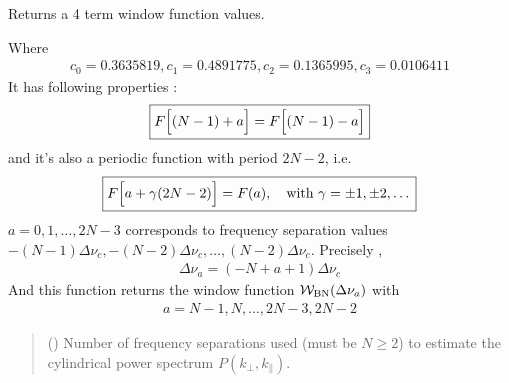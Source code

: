 \documentclass[a4paper,11pt,oneside,english,openany]{sphinxmanual}
\begin{document}
\begin{fulllineitems}
\label{\detokenize{psestimation:psestimation.window}}
\pysigstartsignatures
{}
\pysigstopsignatures
\sphinxAtStartPar
Returns a 4 term  window function values.

\begin{center}
 \end{center}

\sphinxAtStartPar
Where
\begin{equation*}
\begin{split}c_0 = 0.3635819,c_1 = 0.4891775,c_2 = 0.1365995,c_3 = 0.0106411\end{split}
\end{equation*}
\sphinxAtStartPar
It has following properties :
\begin{equation*}
\begin{split}\boxed{F\Bigl[(N-1)+a\Bigr]=F\Bigl[(N-1)-a\Bigr]}\end{split}
\end{equation*}
\sphinxAtStartPar
and it’s also a periodic function with period \(2N-2\), i.e.
\begin{equation*}
\begin{split}\boxed{F\Bigl[a+\gamma(2N-2)\Bigr] = F(a),\quad \text{\rm with } \gamma = \pm1,\pm2,\dots}\end{split}
\end{equation*}
\sphinxAtStartPar
\(a = 0,1,\dots,2N-3\) corresponds to frequency separation values \(-(N-1)\Delta\nu_c,-(N-2)\Delta\nu_c,\dots,(N-2)\Delta\nu_c\). Precisely ,
\begin{equation*}
\begin{split}\boxed{\Delta\nu_a = (-N+a+1)\Delta\nu_c}\end{split}
\end{equation*}
\sphinxAtStartPar
And this function returns the window function \(\mathcal{W}_{\rm BN}(\Delta\nu_a)\) with
\begin{equation*}
\begin{split}a = N-1,N,\dots,2N-3,2N-2\end{split}
\end{equation*}\begin{quote}\begin{description}
\sphinxAtStartPar
{} () \textendash{} Number of frequency separations used (must be \(N\geq2\)) to estimate the cylindrical power spectrum \(P(k_{\perp},k_{\parallel})\).


\end{description}
\end{quote}
\end{fulllineitems}
\end{document}
